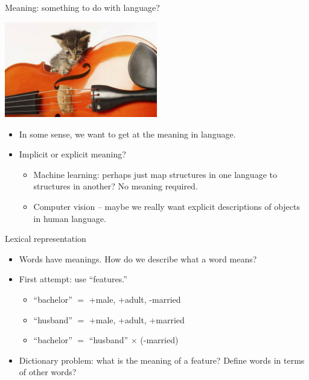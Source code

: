 \documentclass{beamer}
\begin{document}
\begin{frame}{Meaning: something to do with language?}
  \begin{center}
    \includegraphics[width=0.5\textwidth]{images/kitten-violin.jpg}
  \end{center}\pause
  \begin{itemize}
  \item In some sense, we want to get at the meaning in language.\pause
  \item Implicit or explicit meaning?\pause
    \begin{itemize}
    \item Machine learning: perhaps just map structures in one language to structures in another? No meaning required.\pause
    \item Computer vision -- maybe we really want explicit descriptions of objects in human language.
    \end{itemize}
  \end{itemize}
\end{frame}

\begin{frame}{Lexical representation}
  \begin{itemize}
  \item Words have meanings.  How do we describe what a word means?\pause
  \item First attempt: use ``features.'' \pause
    \begin{itemize}
    \item ``bachelor'' $=$ +male, +adult, -married\pause
    \item ``husband'' $=$ +male, +adult, +married\pause
    \item ``bachelor'' $=$ ``husband'' $\times$ (-married)\pause
    \end{itemize}
  \item Dictionary problem: what is the meaning of a feature?  Define words in terms of other words?
  \end{itemize}
\end{frame}
\end{document}
